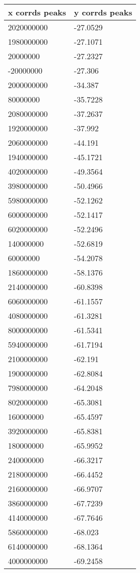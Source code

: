 \begin{tabular}{ll}
x corrds peaks & y corrds peaks \\ 
\hline 
2020000000 & -27.0529 \\ 
1980000000 & -27.1071 \\ 
20000000 & -27.2327 \\ 
-20000000 & -27.306 \\ 
2000000000 & -34.387 \\ 
80000000 & -35.7228 \\ 
2080000000 & -37.2637 \\ 
1920000000 & -37.992 \\ 
2060000000 & -44.191 \\ 
1940000000 & -45.1721 \\ 
4020000000 & -49.3564 \\ 
3980000000 & -50.4966 \\ 
5980000000 & -52.1262 \\ 
6000000000 & -52.1417 \\ 
6020000000 & -52.2496 \\ 
140000000 & -52.6819 \\ 
60000000 & -54.2078 \\ 
1860000000 & -58.1376 \\ 
2140000000 & -60.8398 \\ 
6060000000 & -61.1557 \\ 
4080000000 & -61.3281 \\ 
8000000000 & -61.5341 \\ 
5940000000 & -61.7194 \\ 
2100000000 & -62.191 \\ 
1900000000 & -62.8084 \\ 
7980000000 & -64.2048 \\ 
8020000000 & -65.3081 \\ 
160000000 & -65.4597 \\ 
3920000000 & -65.8381 \\ 
180000000 & -65.9952 \\ 
240000000 & -66.3217 \\ 
2180000000 & -66.4452 \\ 
2160000000 & -66.9707 \\ 
3860000000 & -67.7239 \\ 
4140000000 & -67.7646 \\ 
5860000000 & -68.023 \\ 
6140000000 & -68.1364 \\ 
4000000000 & -69.2458 \\ 

\end{tabular}

